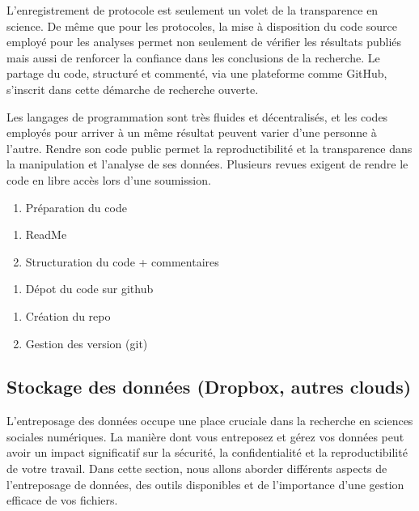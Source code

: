 \documentclass[
  letterpaper,
  DIV=11,
  numbers=noendperiod]{scrreprt}
\providecommand{\tightlist}{%
  \setlength{\itemsep}{0pt}\setlength{\parskip}{0pt}}\usepackage{longtable,booktabs,array}
\begin{document}
L'enregistrement de protocole est seulement un volet de la transparence
en science. De même que pour les protocoles, la mise à disposition du
code source employé pour les analyses permet non seulement de vérifier
les résultats publiés mais aussi de renforcer la confiance dans les
conclusions de la recherche. Le partage du code, structuré et commenté,
via une plateforme comme GitHub, s'inscrit dans cette démarche de
recherche ouverte.

Les langages de programmation sont très fluides et décentralisés, et les
codes employés pour arriver à un même résultat peuvent varier d'une
personne à l'autre. Rendre son code public permet la reproductibilité et
la transparence dans la manipulation et l'analyse de ses données.
Plusieurs revues exigent de rendre le code en libre accès lors d'une
soumission.

\begin{enumerate}
\def\labelenumi{\arabic{enumi}.}
\tightlist
\item
  Préparation du code
\end{enumerate}

\begin{enumerate}
\def\labelenumi{\alph{enumi}.}
\tightlist
\item
  ReadMe
\item
  Structuration du code + commentaires
\end{enumerate}

\begin{enumerate}
\def\labelenumi{\arabic{enumi}.}
\setcounter{enumi}{1}
\tightlist
\item
  Dépot du code sur github
\end{enumerate}

\begin{enumerate}
\def\labelenumi{\alph{enumi}.}
\tightlist
\item
  Création du repo
\item
  Gestion des version (git)
\end{enumerate}

\subsection{Stockage des données (Dropbox, autres
clouds)}\label{stockage-des-donnuxe9es-dropbox-autres-clouds}

L'entreposage des données occupe une place cruciale dans la recherche en
sciences sociales numériques. La manière dont vous entreposez et gérez
vos données peut avoir un impact significatif sur la sécurité, la
confidentialité et la reproductibilité de votre travail. Dans cette
section, nous allons aborder différents aspects de l'entreposage de
données, des outils disponibles et de l'importance d'une gestion
efficace de vos fichiers.
\end{document}
